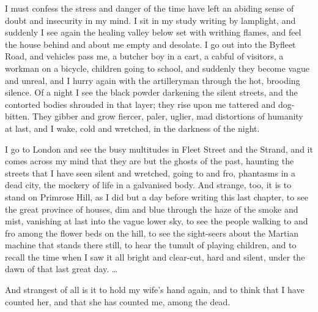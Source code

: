 I must confess the stress and danger of the time have left an
abiding sense of doubt and insecurity in my mind. I sit in my study
writing by lamplight, and suddenly I see again the healing valley
below set with writhing flames, and feel the house behind and about
me empty and desolate. I go out into the Byfleet Road, and vehicles
pass me, a butcher boy in a cart, a cabful of visitors, a workman
on a bicycle, children going to school, and suddenly they become
vague and unreal, and I hurry again with the artilleryman through
the hot, brooding silence. Of a night I see the black powder
darkening the silent streets, and the contorted bodies shrouded in
that layer; they rise upon me tattered and dog-bitten. They gibber
and grow fiercer, paler, uglier, mad distortions of humanity at
last, and I wake, cold and wretched, in the darkness of the night.

I go to London and see the busy multitudes in Fleet Street and the
Strand, and it comes across my mind that they are but the ghosts of
the past, haunting the streets that I have seen silent and
wretched, going to and fro, phantasms in a dead city, the mockery
of life in a galvanised body. And strange, too, it is to stand on
Primrose Hill, as I did but a day before writing this last chapter,
to see the great province of houses, dim and blue through the haze
of the smoke and mist, vanishing at last into the vague lower sky,
to see the people walking to and fro among the flower beds on the
hill, to see the sight-seers about the Martian machine that stands
there still, to hear the tumult of playing children, and to recall
the time when I saw it all bright and clear-cut, hard and silent,
under the dawn of that last great day. \ldots{}

And strangest of all is it to hold my wife's hand again, and to
think that I have counted her, and that she has counted me, among
the dead.


